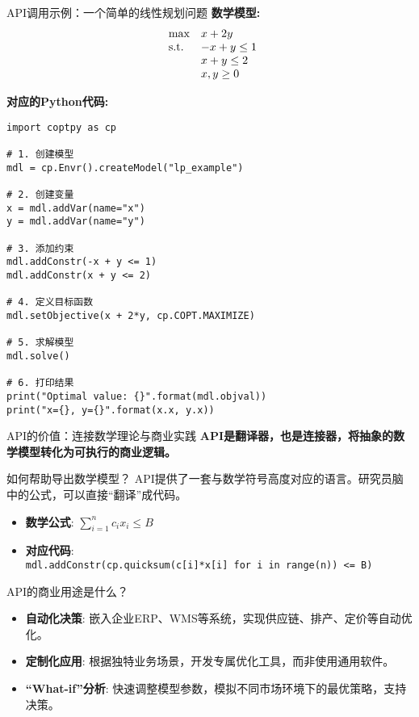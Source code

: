 \documentclass[10pt]{beamer}
\begin{document}
\begin{frame}{API调用示例：一个简单的线性规划问题}
  \textbf{数学模型:}
  \begin{equation*}
    \begin{array}{ll@{}ll}
      \text{max}  & x + 2y \\
      \text{s.t.} & -x + y \leq 1 \\
                  & x + y \leq 2 \\
                  & x, y \geq 0
    \end{array}
  \end{equation*}

  \textbf{对应的Python代码:}

{\footnotesize
\begin{verbatim}
import coptpy as cp

# 1. 创建模型
mdl = cp.Envr().createModel("lp_example")

# 2. 创建变量
x = mdl.addVar(name="x")
y = mdl.addVar(name="y")

# 3. 添加约束
mdl.addConstr(-x + y <= 1)
mdl.addConstr(x + y <= 2)

# 4. 定义目标函数
mdl.setObjective(x + 2*y, cp.COPT.MAXIMIZE)

# 5. 求解模型
mdl.solve()

# 6. 打印结果
print("Optimal value: {}".format(mdl.objval))
print("x={}, y={}".format(x.x, y.x))
\end{verbatim}
}
\end{frame}

\begin{frame}[allowframebreaks]{API的价值：连接数学理论与商业实践}
  \textbf{API是翻译器，也是连接器，将抽象的数学模型转化为可执行的商业逻辑。}
  \begin{block}{如何帮助导出数学模型？}
    API提供了一套与数学符号高度对应的语言。研究员脑中的公式，可以直接“翻译”成代码。
    \begin{itemize}
      \item \textbf{数学公式}: $\sum_{i=1}^{n} c_i x_i \leq B$
      \item \textbf{对应代码}: \\ \texttt{mdl.addConstr(cp.quicksum(c[i]*x[i] for i in range(n)) <= B)}
    \end{itemize}
  \end{block}
  \begin{alertblock}{API的商业用途是什么？}
    \begin{itemize}
      \item \textbf{自动化决策}: 嵌入企业ERP、WMS等系统，实现供应链、排产、定价等自动优化。
      \item \textbf{定制化应用}: 根据独特业务场景，开发专属优化工具，而非使用通用软件。
      \item \textbf{“What-if”分析}: 快速调整模型参数，模拟不同市场环境下的最优策略，支持决策。
    \end{itemize}
  \end{alertblock}
\end{frame}
\end{document}
